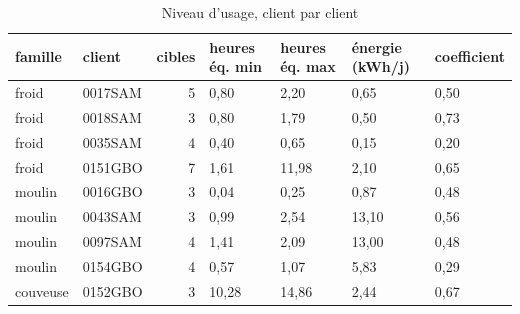 \begin{table}[htbp]
\caption{Niveau d'usage, client par client}
\label{tab:transfert_niveaux}
\begin{tabular}{llrllll}
\toprule
famille & client & cibles & heures éq. min & heures éq. max & énergie (kWh/j) & coefficient \\
\midrule
froid & 0017SAM & 5 & 0,80 & 2,20 & 0,65 & 0,50 \\
froid & 0018SAM & 3 & 0,80 & 1,79 & 0,50 & 0,73 \\
froid & 0035SAM & 4 & 0,40 & 0,65 & 0,15 & 0,20 \\
froid & 0151GBO & 7 & 1,61 & 11,98 & 2,10 & 0,65 \\
moulin & 0016GBO & 3 & 0,04 & 0,25 & 0,87 & 0,48 \\
moulin & 0043SAM & 3 & 0,99 & 2,54 & 13,10 & 0,56 \\
moulin & 0097SAM & 4 & 1,41 & 2,09 & 13,00 & 0,48 \\
moulin & 0154GBO & 4 & 0,57 & 1,07 & 5,83 & 0,29 \\
couveuse & 0152GBO & 3 & 10,28 & 14,86 & 2,44 & 0,67 \\
\bottomrule
\end{tabular}
\end{table}
